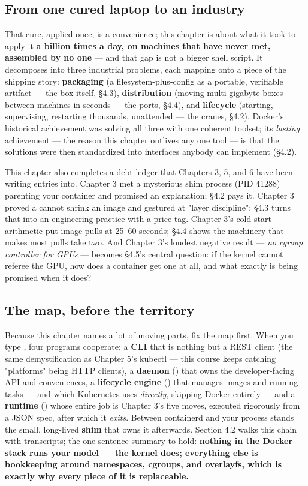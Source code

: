 \subsection*{From one cured laptop to an industry}

That cure, applied once, is a convenience; this chapter is about what it took to apply it \textbf{a billion times a day, on machines that have never met, assembled by no one} — and that gap is not a bigger shell script. It decomposes into three industrial problems, each mapping onto a piece of the shipping story: \textbf{packaging} (a filesystem-plus-config as a portable, verifiable artifact — the box itself, §4.3), \textbf{distribution} (moving multi-gigabyte boxes between machines in seconds — the ports, §4.4), and \textbf{lifecycle} (starting, supervising, restarting thousands, unattended — the cranes, §4.2). Docker's historical achievement was solving all three with one coherent toolset; its \textit{lasting} achievement — the reason this chapter outlives any one tool — is that the solutions were then standardized into interfaces anybody can implement (§4.2).

This chapter also completes a debt ledger that Chapters 3, 5, and 6 have been writing entries into. Chapter 3 met a mysterious shim process (PID 41288) parenting your container and promised an explanation; §4.2 pays it. Chapter 3 proved a  cannot shrink an image and gestured at "layer discipline"; §4.3 turns that into an engineering practice with a price tag. Chapter 3's cold-start arithmetic put image pulls at 25–60 seconds; §4.4 shows the machinery that makes most pulls take two. And Chapter 3's loudest negative result — \textit{no cgroup controller for GPUs} — becomes §4.5's central question: if the kernel cannot referee the GPU, how does a container get one at all, and what exactly is being promised when it does?

\subsection*{The map, before the territory}

Because this chapter names a lot of moving parts, fix the map first. When you type , four programs cooperate: a \textbf{CLI} that is nothing but a REST client (the same demystification as Chapter 5's kubectl — this course keeps catching "platforms" being HTTP clients), a \textbf{daemon} () that owns the developer-facing API and conveniences, a \textbf{lifecycle engine} () that manages images and running tasks — and which Kubernetes uses \textit{directly}, skipping Docker entirely — and a \textbf{runtime} () whose entire job is Chapter 3's five moves, executed rigorously from a JSON spec, after which it \textit{exits}. Between containerd and your process stands the small, long-lived \textbf{shim} that owns it afterwards. Section 4.2 walks this chain with transcripts; the one-sentence summary to hold: \textbf{nothing in the Docker stack runs your model — the kernel does; everything else is bookkeeping around namespaces, cgroups, and overlayfs, which is exactly why every piece of it is replaceable.}

